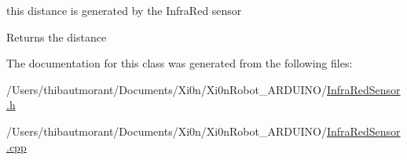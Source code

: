 this distance is generated by the Infra\+Red sensor

\begin{DoxyReturn}{Returns}
the distance 
\end{DoxyReturn}


The documentation for this class was generated from the following files\+:\begin{DoxyCompactItemize}
\item 
/\+Users/thibautmorant/\+Documents/\+Xi0n/\+Xi0n\+Robot\+\_\+\+A\+R\+D\+U\+I\+N\+O/\hyperlink{_infra_red_sensor_8h}{Infra\+Red\+Sensor.\+h}\item 
/\+Users/thibautmorant/\+Documents/\+Xi0n/\+Xi0n\+Robot\+\_\+\+A\+R\+D\+U\+I\+N\+O/\hyperlink{_infra_red_sensor_8cpp}{Infra\+Red\+Sensor.\+cpp}\end{DoxyCompactItemize}
